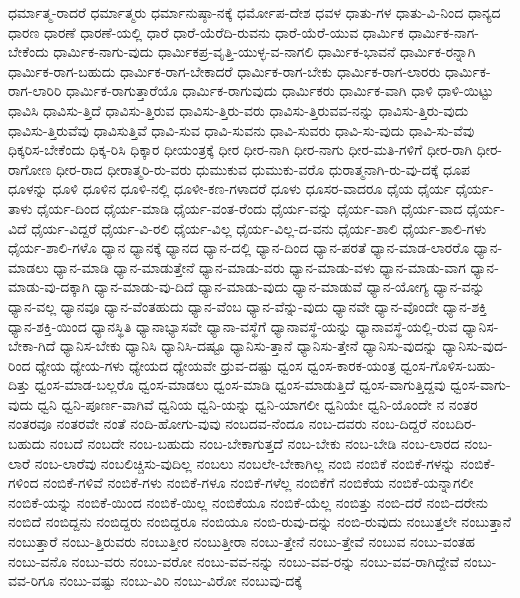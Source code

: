 {ಧರ್ಮಾತ್ಮ-ರಾದರೆ
ಧರ್ಮಾತ್ಮರು
ಧರ್ಮಾನುಷ್ಠಾ-ನಕ್ಕೆ
ಧರ್ಮೋಪ-ದೇಶ
ಧವಳ
ಧಾತು-ಗಳ
ಧಾತು-ವಿ-ನಿಂದ
ಧಾನ್ಯದ
ಧಾರಣ
ಧಾರಣೆ
ಧಾರಣೆ-ಯಲ್ಲಿ
ಧಾರೆ
ಧಾರೆ-ಯೆರೆದಿ-ರುವನು
ಧಾರೆ-ಯೆರೆ-ಯುವ
ಧಾರ್ಮಿಕ
ಧಾರ್ಮಿಕ-ನಾಗ-ಬೇಕೆಂದು
ಧಾರ್ಮಿಕ-ನಾಗು-ವುದು
ಧಾರ್ಮಿಕಪ್ರ-ವೃತ್ತಿ-ಯುಳ್ಳ-ವ-ನಾಗಲಿ
ಧಾರ್ಮಿಕ-ಭಾವನೆ
ಧಾರ್ಮಿಕ-ರನ್ನಾಗಿ
ಧಾರ್ಮಿಕ-ರಾಗ-ಬಹುದು
ಧಾರ್ಮಿಕ-ರಾಗ-ಬೇಕಾದರೆ
ಧಾರ್ಮಿಕ-ರಾಗ-ಬೇಕು
ಧಾರ್ಮಿಕ-ರಾಗ-ಲಾರರು
ಧಾರ್ಮಿಕ-ರಾಗ-ಲಾರಿರಿ
ಧಾರ್ಮಿಕ-ರಾಗುತ್ತಾರೆಯೊ
ಧಾರ್ಮಿಕ-ರಾಗುವುದು
ಧಾರ್ಮಿಕರು
ಧಾರ್ಮಿಕ-ವಾಗಿ
ಧಾಳಿ
ಧಾಳಿ-ಯಿಟ್ಟು
ಧಾವಿಸಿ
ಧಾವಿಸು-ತ್ತಿದೆ
ಧಾವಿಸು-ತ್ತಿರುವ
ಧಾವಿಸು-ತ್ತಿರು-ವರು
ಧಾವಿಸು-ತ್ತಿರುವವ-ನನ್ನು
ಧಾವಿಸು-ತ್ತಿರು-ವುದು
ಧಾವಿಸು-ತ್ತಿರುವೆವು
ಧಾವಿಸುತ್ತಿವೆ
ಧಾವಿ-ಸುವ
ಧಾವಿ-ಸುವನು
ಧಾವಿ-ಸುವರು
ಧಾವಿ-ಸು-ವುದು
ಧಾವಿ-ಸು-ವೆವು
ಧಿಕ್ಕರಿಸ-ಬೇಕೆಂದು
ಧಿಕ್ಕ-ರಿಸಿ
ಧಿಕ್ಕಾರ
ಧೀಯಂತ್ರಕ್ಕೆ
ಧೀರ
ಧೀರ-ನಾಗಿ
ಧೀರ-ನಾಗು
ಧೀರ-ಮತಿ-ಗಳಿಗೆ
ಧೀರ-ರಾಗಿ
ಧೀರ-ರಾಗೋಣ
ಧೀರ-ರಾದ
ಧೀರಾತ್ಮರಿ-ರು-ವರು
ಧುಮುಕುವ
ಧುಮುಕು-ವರೊ
ಧುರಾತ್ಮನಾಗಿ-ರು-ವು-ದಕ್ಕೆ
ಧೂಪ
ಧೂಳನ್ನು
ಧೂಳಿ
ಧೂಳಿನ
ಧೂಳಿ-ನಲ್ಲಿ
ಧೂಳೀ-ಕಣ-ಗಳಾದರೆ
ಧೂಳು
ಧೂಸರ-ವಾದರೂ
ಧೈಯ
ಧೈರ್ಯ
ಧೈರ್ಯ-ತಾಳು
ಧೈರ್ಯ-ದಿಂದ
ಧೈರ್ಯ-ಮಾಡಿ
ಧೈರ್ಯ-ವಂತ-ರೆಂದು
ಧೈರ್ಯ-ವನ್ನು
ಧೈರ್ಯ-ವಾಗಿ
ಧೈರ್ಯ-ವಾದ
ಧೈರ್ಯ-ವಿದೆ
ಧೈರ್ಯ-ವಿದ್ದರೆ
ಧೈರ್ಯ-ವಿ-ರಲಿ
ಧೈರ್ಯ-ವಿಲ್ಲ
ಧೈರ್ಯ-ವಿಲ್ಲ-ದ-ವನು
ಧೈರ್ಯ-ಶಾಲಿ
ಧೈರ್ಯ-ಶಾಲಿ-ಗಳು
ಧೈರ್ಯ-ಶಾಲಿ-ಗಳೊ
ಧ್ಯಾನ
ಧ್ಯಾನಕ್ಕೆ
ಧ್ಯಾನದ
ಧ್ಯಾನ-ದಲ್ಲಿ
ಧ್ಯಾನ-ದಿಂದ
ಧ್ಯಾನ-ಪರತೆ
ಧ್ಯಾನ-ಮಾಡ-ಲಾರರೊ
ಧ್ಯಾನ-ಮಾಡಲು
ಧ್ಯಾನ-ಮಾಡಿ
ಧ್ಯಾನ-ಮಾಡುತ್ತೇನೆ
ಧ್ಯಾನ-ಮಾಡು-ವರು
ಧ್ಯಾನ-ಮಾಡು-ವಳು
ಧ್ಯಾನ-ಮಾಡು-ವಾಗ
ಧ್ಯಾನ-ಮಾಡು-ವು-ದಕ್ಕಾಗಿ
ಧ್ಯಾನ-ಮಾಡು-ವು-ದಿದೆ
ಧ್ಯಾನ-ಮಾಡು-ವುದು
ಧ್ಯಾನ-ಮಾಡುವೆ
ಧ್ಯಾನ-ಯೋಗ್ಯ
ಧ್ಯಾನ-ವನ್ನು
ಧ್ಯಾನ-ವಲ್ಲ
ಧ್ಯಾನವೂ
ಧ್ಯಾನ-ವೆಂತಹುದು
ಧ್ಯಾನ-ವೆಂಬ
ಧ್ಯಾನ-ವೆನ್ನು-ವುದು
ಧ್ಯಾನವೇ
ಧ್ಯಾನ-ವೊಂದೇ
ಧ್ಯಾನ-ಶಕ್ತಿ
ಧ್ಯಾನ-ಶಕ್ತಿ-ಯಿಂದ
ಧ್ಯಾನಸ್ಥಿತಿ
ಧ್ಯಾನಾಭ್ಯಾಸವೇ
ಧ್ಯಾನಾ-ವಸ್ಥೆಗೆ
ಧ್ಯಾನಾವಸ್ಥೆ-ಯನ್ನು
ಧ್ಯಾನಾವಸ್ಥೆ-ಯಲ್ಲಿ-ರುವ
ಧ್ಯಾನಿಸ-ಬೇಕಾ-ಗಿದೆ
ಧ್ಯಾನಿಸ-ಬೇಕು
ಧ್ಯಾನಿಸಿ
ಧ್ಯಾನಿಸಿ-ದಷ್ಟೂ
ಧ್ಯಾನಿಸು-ತ್ತಾನೆ
ಧ್ಯಾನಿಸು-ತ್ತೇನೆ
ಧ್ಯಾನಿಸು-ವುದನ್ನು
ಧ್ಯಾನಿಸು-ವುದ-ರಿಂದ
ಧ್ಯೇಯ
ಧ್ಯೇಯ-ಗಳು
ಧ್ಯೇಯದ
ಧ್ಯೇಯವೇ
ಧ್ರುವ-ದಷ್ಟು
ಧ್ವಂಸ
ಧ್ವಂಸ-ಕಾರಕ-ಯಂತ್ರ
ಧ್ವಂಸ-ಗೊಳಿಸ-ಬಹು-ದಿತ್ತು
ಧ್ವಂಸ-ಮಾಡ-ಬಲ್ಲರೊ
ಧ್ವಂಸ-ಮಾಡಲು
ಧ್ವಂಸ-ಮಾಡಿ
ಧ್ವಂಸ-ಮಾಡುತ್ತಿದೆ
ಧ್ವಂಸ-ವಾಗುತ್ತಿದ್ದವು
ಧ್ವಂಸ-ವಾಗು-ವುದು
ಧ್ವನಿ
ಧ್ವನಿ-ಪೂರ್ಣ-ವಾಗಿವೆ
ಧ್ವನಿಯ
ಧ್ವನಿ-ಯನ್ನು
ಧ್ವನಿ-ಯಾಗಲೀ
ಧ್ವನಿಯೇ
ಧ್ವನಿ-ಯೊಂದೇ
ನ
ನಂತರ
ನಂತರವೂ
ನಂತರವೇ
ನಂತೆ
ನಂದಿ-ಹೋಗು-ವುವು
ನಂಬದವ-ನೆಂದೂ
ನಂಬ-ದವರು
ನಂಬ-ದಿದ್ದರೆ
ನಂಬದಿರ-ಬಹುದು
ನಂಬದೆ
ನಂಬದೇ
ನಂಬ-ಬಹುದು
ನಂಬ-ಬೇಕಾಗುತ್ತದೆ
ನಂಬ-ಬೇಕು
ನಂಬ-ಬೇಡಿ
ನಂಬ-ಲಾರದ
ನಂಬ-ಲಾರೆ
ನಂಬ-ಲಾರೆವು
ನಂಬಲಿಚ್ಚಿಸು-ವುದಿಲ್ಲ
ನಂಬಲು
ನಂಬಲೇ-ಬೇಕಾಗಿಲ್ಲ
ನಂಬಿ
ನಂಬಿಕೆ
ನಂಬಿಕೆ-ಗಳನ್ನು
ನಂಬಿಕೆ-ಗಳಿಂದ
ನಂಬಿಕೆ-ಗಳಿವೆ
ನಂಬಿಕೆ-ಗಳು
ನಂಬಿಕೆ-ಗಳೂ
ನಂಬಿಕೆ-ಗಳೆಲ್ಲ
ನಂಬಿಕೆಗೆ
ನಂಬಿಕೆಯ
ನಂಬಿಕೆ-ಯನ್ನಾಗಲೀ
ನಂಬಿಕೆ-ಯನ್ನು
ನಂಬಿಕೆ-ಯಿಂದ
ನಂಬಿಕೆ-ಯಿಲ್ಲ
ನಂಬಿಕೆಯೂ
ನಂಬಿಕೆ-ಯೆಲ್ಲ
ನಂಬಿತ್ತು
ನಂಬಿ-ದರೆ
ನಂಬಿ-ದರೇನು
ನಂಬಿದೆ
ನಂಬಿದ್ದನು
ನಂಬಿದ್ದರು
ನಂಬಿದ್ದರೂ
ನಂಬಿಯೂ
ನಂಬಿ-ರುವು-ದನ್ನು
ನಂಬಿ-ರುವುದು
ನಂಬುತ್ತಲೇ
ನಂಬುತ್ತಾನೆ
ನಂಬುತ್ತಾರೆ
ನಂಬು-ತ್ತಿರುವರು
ನಂಬುತ್ತೀರ
ನಂಬುತ್ತೀರಾ
ನಂಬು-ತ್ತೇನೆ
ನಂಬು-ತ್ತೇವೆ
ನಂಬುವ
ನಂಬು-ವಂತಹ
ನಂಬು-ವನೊ
ನಂಬು-ವರು
ನಂಬು-ವರೋ
ನಂಬು-ವವ-ನನ್ನು
ನಂಬು-ವವ-ರನ್ನು
ನಂಬು-ವವ-ರಾಗಿದ್ದೇವೆ
ನಂಬು-ವವ-ರಿಗೂ
ನಂಬು-ವಷ್ಟು
ನಂಬು-ವಿರಿ
ನಂಬು-ವಿರೋ
ನಂಬುವು-ದಕ್ಕೆ
}

